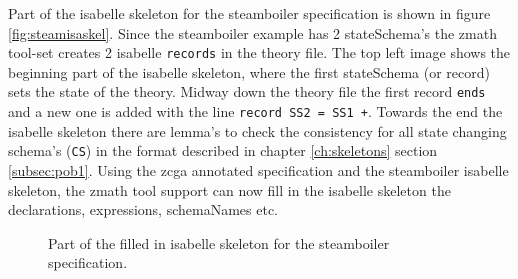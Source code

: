 Part of the isabelle skeleton for the steamboiler specification is shown in
figure \ref{fig:steamisaskel}. Since the steamboiler example has 2 stateSchema's
the \gls{zmath} tool-set creates 2 isabelle 	\texttt{records} in the theory file.
The top left image shows the beginning part of the isabelle skeleton, where the
first stateSchema (or record) sets the state of the theory. Midway down the
theory file the first record \texttt{ends} and a new one is added with the line
\verb|record SS2 = SS1 +|. Towards the end the isabelle skeleton there are
lemma's to check the consistency for all state changing schema's (\texttt{CS})
in the format described in chapter \ref{ch:skeletons} section \ref{subsec:pob1}.
Using the \gls{zcga} annotated specification and the steamboiler isabelle
skeleton, the \gls{zmath} tool support can now fill in the isabelle skeleton the
declarations, expressions, schemaNames etc.

\begin{figure}[H]
    \hfill
    \hfill
    \hfill
    \caption{Part of the filled in isabelle skeleton for the steamboiler specification.\label{fig:filledinsteamskeleton}}
\end{figure}


